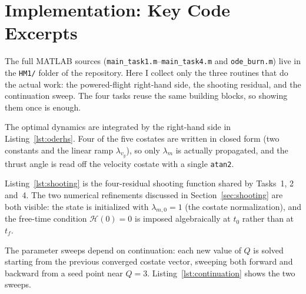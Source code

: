 \documentclass[../main.tex]{subfiles}
\begin{document}
\section{Implementation: Key Code Excerpts}\label{sec:appendix_code}

The full MATLAB sources (\texttt{main\_task1.m}--\texttt{main\_task4.m} and \texttt{ode\_burn.m}) live in the \texttt{HM1/} folder of the repository. Here I collect only the three routines that do the actual work: the powered-flight right-hand side, the shooting residual, and the continuation sweep. The four tasks reuse the same building blocks, so showing them once is enough.

The optimal dynamics are integrated by the right-hand side in Listing~\ref{lst:oderhs}. Four of the five costates are written in closed form (two constants and the linear ramp $\lambda_{v_y}$), so only $\lambda_m$ is actually propagated, and the thrust angle is read off the velocity costate with a single \texttt{atan2}.



Listing~\ref{lst:shooting} is the four-residual shooting function shared by Tasks~1, 2 and~4. The two numerical refinements discussed in Section~\ref{sec:shooting} are both visible: the state is initialized with $\lambda_{m,0}=1$ (the costate normalization), and the free-time condition $\mathcal{H}(0)=0$ is imposed algebraically at $t_0$ rather than at $t_f$.



The parameter sweeps depend on continuation: each new value of $Q$ is solved starting from the previous converged costate vector, sweeping both forward and backward from a seed point near $Q=3$. Listing~\ref{lst:continuation} shows the two sweeps.


\end{document}
